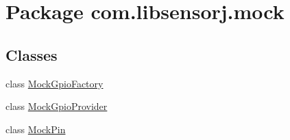 \hypertarget{namespacecom_1_1libsensorj_1_1mock}{}\section{Package com.\+libsensorj.\+mock}
\label{namespacecom_1_1libsensorj_1_1mock}
\subsection*{Classes}
\begin{DoxyCompactItemize}
\item 
class \hyperlink{classcom_1_1libsensorj_1_1mock_1_1MockGpioFactory}{Mock\+Gpio\+Factory}
\item 
class \hyperlink{classcom_1_1libsensorj_1_1mock_1_1MockGpioProvider}{Mock\+Gpio\+Provider}
\item 
class \hyperlink{classcom_1_1libsensorj_1_1mock_1_1MockPin}{Mock\+Pin}
\end{DoxyCompactItemize}
